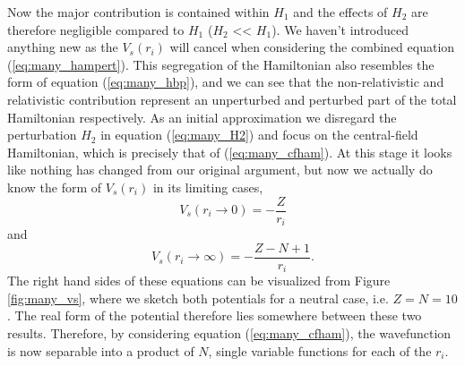 Now the major contribution is contained within $H_1$ and the effects of $H_2$ are therefore negligible compared to $H_1$ ($H_2$ << $H_1$). We haven't introduced anything new as the $V_s(r_i)$ will cancel when considering the combined equation (\ref{eq:many_hampert}). This segregation of the Hamiltonian also resembles the form of equation (\ref{eq:many_hbp}), and we can see that the non-relativistic and relativistic contribution represent an unperturbed and perturbed part of the total Hamiltonian respectively. As an initial approximation we disregard the perturbation $H_2$ in equation (\ref{eq:many_H2}) and focus on the central-field Hamiltonian, which is precisely that of (\ref{eq:many_cfham}). At this stage it looks like nothing has changed from our original argument, but now we actually do know the form of $V_s(r_i)$ in its limiting cases, \\
\begin{equation}\label{eq:many_vsrzero}
V_s(r_i \rightarrow 0) = -\frac{Z}{r_i}
\end{equation}
and
\begin{equation}\label{eq:many_vsrinf}
V_s(r_i \rightarrow \infty) = -\frac{Z-N+1}{r_i}     . 
\end{equation}
The right hand sides of these equations can be visualized from Figure \ref{fig:many_vs}, where we sketch both potentials for a neutral case, i.e. $Z=N=10$. The real form of the potential therefore lies somewhere between these two results. Therefore, by considering equation (\ref{eq:many_cfham}), the wavefunction is now separable into a product of $N$, single variable functions for each of the $r_i$.


